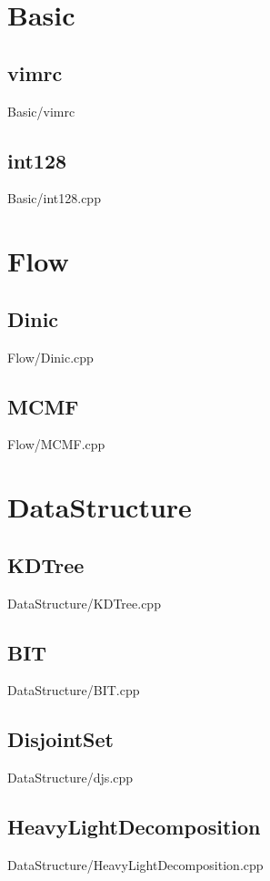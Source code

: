 \section{Basic}
    \subsection{vimrc}
         {Basic/vimrc}
    \subsection{int128}
         {Basic/int128.cpp}

\section{Flow}
    \subsection{Dinic}
         {Flow/Dinic.cpp}
    \subsection{MCMF}
         {Flow/MCMF.cpp}

\section{DataStructure}
    \subsection{KDTree}
         {DataStructure/KDTree.cpp}
    \subsection{BIT}
         {DataStructure/BIT.cpp}
    \subsection{DisjointSet}
         {DataStructure/djs.cpp}
    \subsection{HeavyLightDecomposition}
         {DataStructure/HeavyLightDecomposition.cpp}
